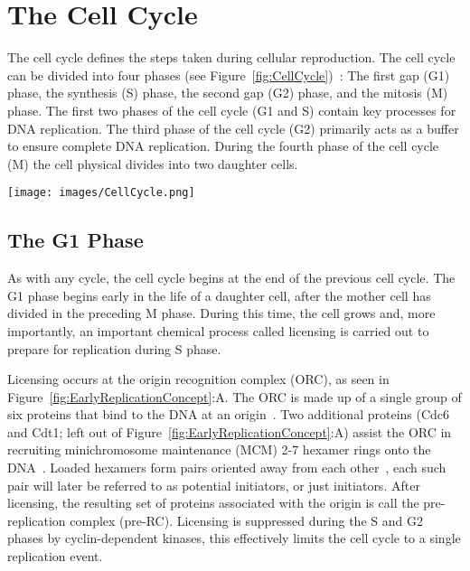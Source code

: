 	\section{The Cell Cycle}
	\label{sec:CellCycle}
	
	The cell cycle defines the steps taken during cellular reproduction.
	The cell cycle can be divided into four phases (see Figure~\ref{fig:CellCycle})~\cite{MolecularCellBiology,CellMolApproach}:
	The first gap (G1) phase, the synthesis (S) phase, the second gap (G2) phase, and the mitosis (M) phase.
	The first two phases of the cell cycle (G1 and S) contain key processes for DNA replication.
	The third phase of the cell cycle (G2) primarily acts as a buffer to ensure complete DNA replication.
	During the fourth phase of the cell cycle (M) the cell physical divides into two daughter cells.
	
	\begin{SCfigure}[1][thb]
		\texttt{[image: images/CellCycle.png]}
		\caption[Cell Cycle]{\label{fig:CellCycle} The complete cell cycle is made up of four phases: 
			The Mitosis (M) phase, when a mother cell separates into two daughter cells. 
			The first Gap (G1) phase, when the daughter cell undergoes growth and chemical preparation for DNA replication.
			The Synthesis (S) phase, when the DNA is replicated.
			And the second Gap (G2) phase which acts as a buffer to ensure complete replication before the M phase.}
	\end{SCfigure}
	
	
		\subsection{The G1 Phase}
		\label{subsec:G1Phase}
		
		As with any cycle, the cell cycle begins at the end of the previous cell cycle.
		The G1 phase begins early in the life of a daughter cell, after the mother cell has divided in the preceding M phase.
		During this time, the cell grows and, more importantly, an important chemical process called licensing is carried out to prepare for replication during S phase.
		
		Licensing occurs at the origin recognition complex (ORC), as seen in Figure~\ref{fig:EarlyReplicationConcept}:A.
		The ORC is made up of a single group of six proteins that bind to the DNA at an origin~\cite{ORC}.
		Two additional proteins (Cdc6 and Cdt1; left out of Figure~\ref{fig:EarlyReplicationConcept}:A) assist the ORC in recruiting minichromosome maintenance (MCM) 2-7 hexamer rings onto the DNA~\cite{DNARepInitiation}.
		Loaded hexamers form pairs oriented away from each other~\cite{MCMPairs}, each such pair will later be referred to as potential initiators, or just initiators.
		After licensing, the resulting set of proteins associated with the origin is call the pre-replication complex (pre-RC).
		Licensing is suppressed during the S and G2 phases by cyclin-dependent kinases, this effectively limits the cell cycle to a single replication event.~\cite{MolecularCellBiology}
		
